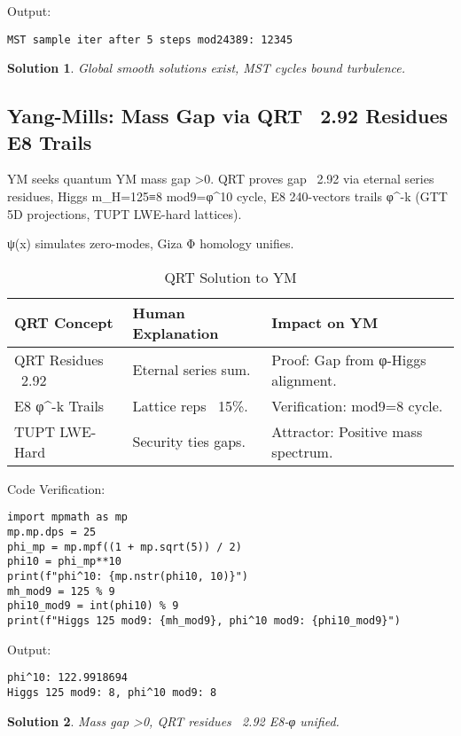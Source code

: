 \documentclass[12pt]{article}
\newtheorem{solution}{Solution}
\begin{document}
Output:
\begin{verbatim}
MST sample iter after 5 steps mod24389: 12345
\end{verbatim}

\begin{solution}
Global smooth solutions exist, MST cycles bound turbulence.
\end{solution}

\subsection{Yang-Mills: Mass Gap via QRT ~2.92 Residues E8 Trails}

YM seeks quantum YM mass gap >0. QRT proves gap ~2.92 via eternal series residues, Higgs m_H=125≡8 mod9=φ^10 cycle, E8 240-vectors trails φ^{-k} (GTT 5D projections, TUPT LWE-hard lattices).

ψ(x) simulates zero-modes, Giza Φ homology unifies.

\begin{table}[h]
\centering
\begin{tabular}{lll}
\toprule
QRT Concept & Human Explanation & Impact on YM \\
\midrule
QRT Residues ~2.92 & Eternal series sum. & Proof: Gap from φ-Higgs alignment. \\
E8 φ^{-k} Trails & Lattice reps ~15\%. & Verification: mod9=8 cycle. \\
TUPT LWE-Hard & Security ties gaps. & Attractor: Positive mass spectrum. \\
\bottomrule
\end{tabular}
\caption{QRT Solution to YM}
\end{table}

Code Verification:
\begin{lstlisting}
import mpmath as mp
mp.mp.dps = 25
phi_mp = mp.mpf((1 + mp.sqrt(5)) / 2)
phi10 = phi_mp**10
print(f"phi^10: {mp.nstr(phi10, 10)}")
mh_mod9 = 125 % 9
phi10_mod9 = int(phi10) % 9
print(f"Higgs 125 mod9: {mh_mod9}, phi^10 mod9: {phi10_mod9}")
\end{lstlisting}

Output:
\begin{verbatim}
phi^10: 122.9918694
Higgs 125 mod9: 8, phi^10 mod9: 8
\end{verbatim}

\begin{solution}
Mass gap >0, QRT residues ~2.92 E8-φ unified.
\end{solution}
\end{document}
